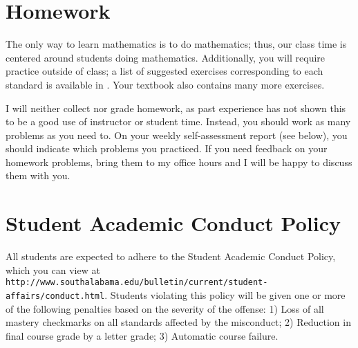 \documentclass{article}
\begin{document}
\section*{\fontsize{12}{15}\selectfont Homework}
The only way to learn mathematics is to do mathematics; thus, our class time is centered around students doing mathematics.  Additionally, you will require practice outside of class; a list of suggested exercises corresponding to each standard is available in \LMS.  Your textbook also contains many more exercises.

I will neither collect nor grade homework, as past experience has not shown this to be a good use of instructor or student time.  Instead, you should work as many problems as you need to.  On your weekly self-assessment report (see below), you should indicate which problems you practiced. If you need feedback on your homework problems, bring them to my office hours and I will be happy to discuss them with you.


\section*{\fontsize{12}{15}\selectfont Student Academic Conduct Policy}
All students are expected to adhere to the Student Academic Conduct Policy, which you can view at
{\tt http://www.southalabama.edu/bulletin/current/student-affairs/conduct.html}.  Students violating this policy will be given one or more of the following penalties based on the severity of the offense:  1) Loss of all mastery checkmarks on all standards affected by the misconduct; 2) Reduction in final course grade by a letter grade; 3) Automatic course failure.
\end{document}
